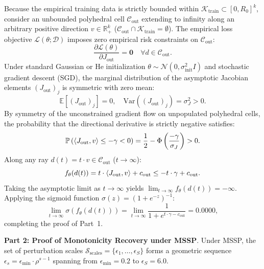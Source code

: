 \begin{IEEEproof}
Because the empirical training data is strictly bounded within $\mathcal{K}_{\text{train}} \subset [0, R_0]^k$, consider an unbounded polyhedral cell $\mathcal{C}_{\text{out}}$ extending to infinity along an arbitrary positive direction $v \in \mathbb{R}_+^k$ ($\mathcal{C}_{\text{out}} \cap \mathcal{K}_{\text{train}} = \emptyset$). The empirical loss objective $\mathcal{L}(\theta; \mathcal{D})$ imposes zero empirical risk constraints on $\mathcal{C}_{\text{out}}$:
\begin{equation}
\frac{\partial \mathcal{L}(\theta)}{\partial J_{\text{out}}} = \mathbf{0} \quad \forall d \in \mathcal{C}_{\text{out}}.
\end{equation}
Under standard Gaussian or He initialization $\theta \sim \mathcal{N}(0, \sigma_{\text{init}}^2 I)$ and stochastic gradient descent (SGD), the marginal distribution of the asymptotic Jacobian elements $(J_{\text{out}})_j$ is symmetric with zero mean:
\begin{equation}
\mathbb{E}[(J_{\text{out}})_j] = 0, \quad \text{Var}((J_{\text{out}})_j) = \sigma_J^2 > 0.
\end{equation}
By symmetry of the unconstrained gradient flow on unpopulated polyhedral cells, the probability that the directional derivative is strictly negative satisfies:
\begin{equation}
\mathbb{P}\left( \left\langle J_{\text{out}},v\right\rangle \le -\gamma < 0 \right) = \frac{1}{2} - \Phi\left(\frac{-\gamma}{\sigma_J}\right) > 0.
\end{equation}
Along any ray $d(t) = t \cdot v \in \mathcal{C}_{\text{out}}$ ($t \to \infty$):
\begin{equation}
f_\theta(d(t)) = t \cdot \left\langle J_{\text{out}},v\right\rangle + c_{\text{out}} \le -t \cdot \gamma + c_{\text{out}}.
\end{equation}
Taking the asymptotic limit as $t \to \infty$ yields $\lim_{t \to \infty} f_\theta(d(t)) = -\infty$. Applying the sigmoid function $\sigma(z) = (1 + e^{-z})^{-1}$:
\begin{equation}
\lim_{t \to \infty} \sigma(f_\theta(d(t))) = \lim_{t \to \infty} \frac{1}{1 + e^{t \cdot \gamma - c_{\text{out}}}} = 0.0000,
\end{equation}
completing the proof of Part~1.

\textbf{Part 2: Proof of Monotonicity Recovery under MSSP}.
Under MSSP, the set of perturbation scales $\mathcal{S}_{\text{scales}} = \{\epsilon_1, \dots, \epsilon_S\}$ forms a geometric sequence $\epsilon_s = \epsilon_{\min} \cdot \rho^{s-1}$ spanning from $\epsilon_{\min} = 0.2$ to $\epsilon_S = 6.0$. 


\end{IEEEproof}
